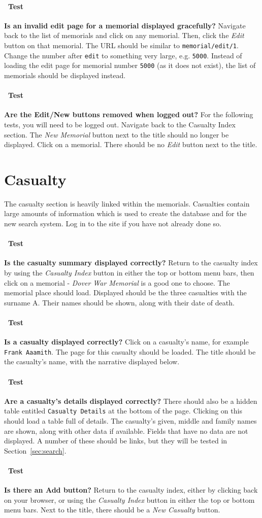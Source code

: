 \documentclass[12pt]{article}
\newcounter{Test}
\newcommand{\test}[1]{%
\stepcounter{Test}%
\paragraph{\Circle\ Test \theTest} \textbf{#1} }
\begin{document}
\test{Is an invalid edit page for a memorial displayed gracefully?}
Navigate back to the list of memorials and click on any memorial. Then, click the \textit{Edit} button on that memorial. The URL should be similar to \texttt{memorial/edit/1}. Change the number after \texttt{edit} to something very large, e.g. \texttt{5000}. Instead of loading the edit page for memorial number \texttt{5000} (as it does not exist), the list of memorials should be displayed instead.

\test{Are the Edit/New buttons removed when logged out?}
For the following tests, you will need to be logged out. Navigate back to the Casualty Index section. The \textit{New Memorial} button next to the title should no longer be displayed. Click on a memorial. There should be no \textit{Edit} button next to the title.

\section{Casualty}\label{sec:casualty}
The casualty section is heavily linked within the memorials. Casualties contain large amounts of information which is used to create the database and for the new search system. Log in to the site if you have not already done so.

\test{Is the casualty summary displayed correctly?}
Return to the casualty index by using the \textit{Casualty Index} button in either the top or bottom menu bars, then click on a memorial - \textit{Dover War Memorial} is a good one to choose. The memorial place should load. Displayed should be the three casualties with the surname A. Their names should be shown, along with their date of death.

\test{Is a casualty displayed correctly?}
Click on a casualty's name, for example \texttt{Frank Aaamith}. The page for this casualty should be loaded. The title should be the casualty's name, with the narrative displayed below.

\test{Are a casualty's details displayed correctly?}
There should also be a hidden table entitled \texttt{Casualty Details} at the bottom of the page. Clicking on this should load a table full of details. The casualty's given, middle and family names are shown, along with other data if available. Fields that have no data are not displayed. A number of these should be links, but they will be tested in Section~\ref{sec:search}.

\test{Is there an Add button?}
Return to the casualty index, either by clicking back on your browser, or using the \textit{Casualty Index} button in either the top or bottom menu bars. Next to the title, there should be a \textit{New Casualty} button.
\end{document}
